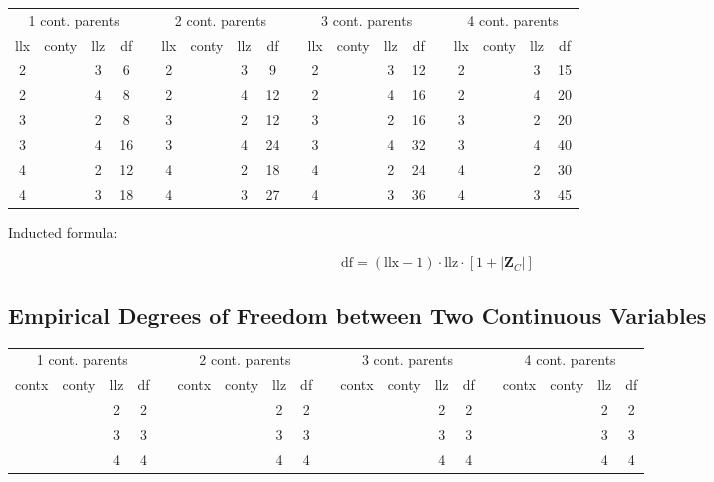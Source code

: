 \documentclass[12pt]{article}
\newcommand{\zc}{\mathbf{Z}_C}
\begin{document}
\begin{table}[h]
\begin{center}
\begin{tabular}{ccccccccccccccccccc}
\multicolumn{4}{c}{1 cont. parents} & &\multicolumn{4}{c}{2 cont. parents} & &\multicolumn{4}{c}{3 cont. parents} & & \multicolumn{4}{c}{4 cont. parents}\\
llx & conty & llz & df & & llx & conty  & llz & df & & llx & conty & llz & df & & llx & conty  & llz & df\\
2 & & 3 & 6 & & 2 & & 3 & 9 & & 2 & & 3 & 12 & & 2 & & 3 & 15\\
2 & & 4 & 8 & & 2 & & 4 & 12 & & 2 & & 4 & 16 & & 2 & & 4 & 20\\
3 & & 2 & 8 & & 3 & & 2 & 12 & & 3 & & 2 & 16 & & 3 & & 2 & 20\\
3 & & 4 & 16 & & 3 & & 4 & 24 & & 3 & & 4 & 32 & & 3 & & 4 & 40\\
4 & & 2 & 12 & & 4 & & 2 & 18 & & 4 & & 2 & 24 & & 4 & & 2 & 30\\
4 & & 3 & 18 & & 4 & & 3 & 27 & & 4 & & 3 & 36 & & 4 & & 3 & 45
\end{tabular}
\end{center}
\end{table}

Inducted formula:

\begin{equation}
\text{df} = (\text{llx} - 1)\cdot\text{llz}\cdot\left[1 + \lvert\zc\rvert\right]
\end{equation}

\subsection{Empirical Degrees of Freedom between Two Continuous Variables}

\begin{table}[h]
\begin{center}
\begin{tabular}{ccccccccccccccccccc}
\multicolumn{4}{c}{1 cont. parents} & &\multicolumn{4}{c}{2 cont. parents} & &\multicolumn{4}{c}{3 cont. parents} & & \multicolumn{4}{c}{4 cont. parents}\\
contx & conty & llz & df & & contx & conty  & llz & df & & contx & conty & llz & df & & contx & conty  & llz & df\\
 & & 2 & 2 & & & & 2 & 2 & & & & 2 & 2 & & & & 2 & 2\\
 & & 3 & 3 & & & & 3 & 3 & & & & 3 & 3 & & & & 3 & 3\\
 & & 4 & 4 & & & & 4 & 4 & & & & 4 & 4 & & & & 4 & 4
\end{tabular}
\end{center}
\end{table}
\end{document}
